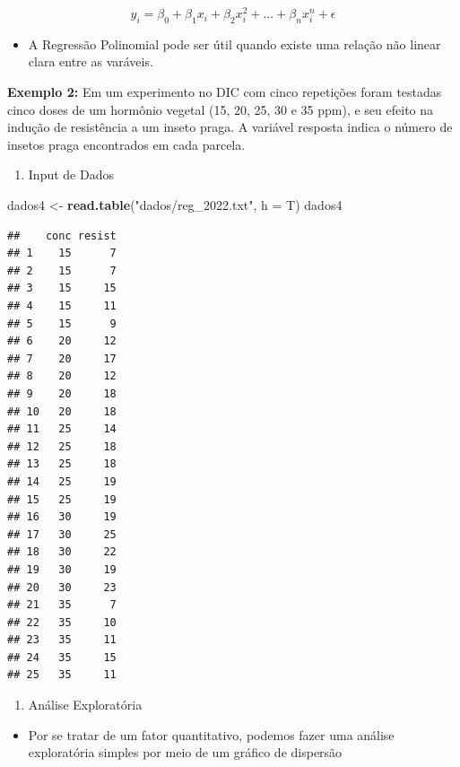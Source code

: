\documentclass[
]{book}
\newenvironment{Shaded}{\begin{snugshade}}{\end{snugshade}}
\newcommand{\AttributeTok}[1]{\textcolor[rgb]{0.13,0.29,0.53}{#1}}
\newcommand{\FunctionTok}[1]{\textcolor[rgb]{0.13,0.29,0.53}{\textbf{#1}}}
\newcommand{\NormalTok}[1]{#1}
\newcommand{\OtherTok}[1]{\textcolor[rgb]{0.56,0.35,0.01}{#1}}
\newcommand{\StringTok}[1]{\textcolor[rgb]{0.31,0.60,0.02}{#1}}
\providecommand{\tightlist}{%
  \setlength{\itemsep}{0pt}\setlength{\parskip}{0pt}}
\begin{document}
\[y_{i}=\beta _{0}+\beta _{1}x_{i}+\beta _{2}x_{i}^2+...+\beta _{n}x_{i}^n+\epsilon\]

\begin{itemize}
\tightlist
\item
  A Regressão Polinomial pode ser útil quando existe uma relação não linear clara entre as varáveis.
\end{itemize}

\textbf{Exemplo 2:} Em um experimento no DIC com cinco repetições foram testadas cinco doses de um hormônio vegetal (15, 20, 25, 30 e 35 ppm), e seu efeito na indução de resistência a um inseto praga. A variável resposta indica o número de insetos praga encontrados em cada parcela.

\begin{enumerate}
\def\labelenumi{\arabic{enumi}.}
\tightlist
\item
  Input de Dados
\end{enumerate}

\begin{Shaded}
\begin{Highlighting}[]
\NormalTok{dados4 }\OtherTok{\textless{}{-}} \FunctionTok{read.table}\NormalTok{(}\StringTok{"dados/reg\_2022.txt"}\NormalTok{, }\AttributeTok{h =}\NormalTok{ T)}
\NormalTok{dados4}
\end{Highlighting}
\end{Shaded}

\begin{verbatim}
##    conc resist
## 1    15      7
## 2    15      7
## 3    15     15
## 4    15     11
## 5    15      9
## 6    20     12
## 7    20     17
## 8    20     12
## 9    20     18
## 10   20     18
## 11   25     14
## 12   25     18
## 13   25     18
## 14   25     19
## 15   25     19
## 16   30     19
## 17   30     25
## 18   30     22
## 19   30     19
## 20   30     23
## 21   35      7
## 22   35     10
## 23   35     11
## 24   35     15
## 25   35     11
\end{verbatim}

\begin{enumerate}
\def\labelenumi{\arabic{enumi}.}
\setcounter{enumi}{1}
\tightlist
\item
  Análise Exploratória
\end{enumerate}

\begin{itemize}
\tightlist
\item
  Por se tratar de um fator quantitativo, podemos fazer uma análise exploratória simples por meio de um gráfico de dispersão
\end{itemize}
\end{document}
